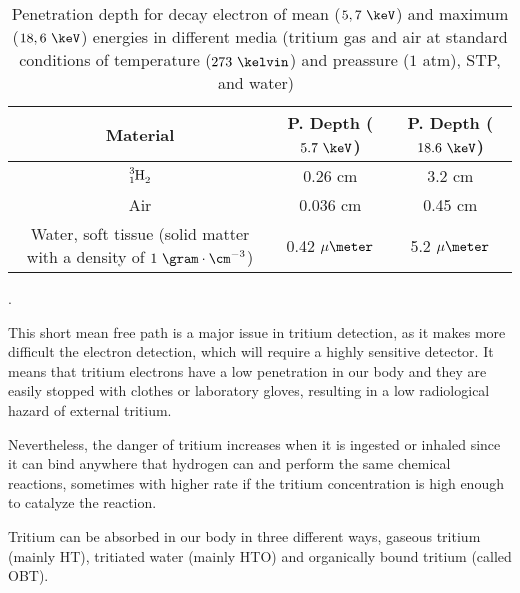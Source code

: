 \begin{table}[htbp]
\begin{center}
\begin{tabular}{|c|c|c|}
\hline
Material & P. Depth ($5.7~\keV$) & P. Depth ($18.6~\keV$)\\
\hline \hline \hline
$\ce{\ce{^{3}_{1}H_2}}$ & 0.26 cm & 3.2 cm \\ \hline
Air & 0.036 cm & 0.45 cm \\ \hline
\parbox{10em}{\centering Water, soft tissue\\  (solid matter with a \\  density of $1~\gram\cdot\cm^{-3}$)} & 0.42 $\mu\meter$ & 5.2 $\mu\meter$ \\ \hline
\end{tabular}
\caption{Penetration depth for decay electron of mean ($5,7~\keV$) and maximum ($18,6~\keV$) energies in different media (tritium gas and air at standard conditions of temperature ($273~\kelvin$) and preassure ($1$ atm), STP, and water)~\cite{MeanFreePathDocument}}.
\label{tab:MeanFreePathTritium}
\end{center}
\end{table}

This short mean free path is a major issue in tritium detection, as it makes more difficult the electron detection, which will require a highly sensitive detector. It means that tritium electrons have a low penetration in our body and they are easily stopped with clothes or laboratory gloves, resulting in a low radiological hazard of external tritium.

Nevertheless, the danger of tritium increases when it is ingested or inhaled since it can bind anywhere that hydrogen can and perform the same chemical reactions, sometimes with higher rate if the tritium concentration is high enough to catalyze the reaction. 

Tritium can be absorbed in our body in three different ways, gaseous tritium (mainly HT), tritiated water (mainly HTO) and organically bound tritium (called OBT).


